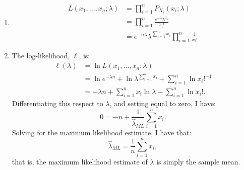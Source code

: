 \begin{problem}{8}  $ $

\begin{enumerate}
\item

\begin{align*}
L(x_1, \ldots, x_n; \lambda) &= \prod_{i=1}^n P_{X_i}(x_i; \lambda)\\
& = \prod_{i=1}^n \frac{e^{-\lambda} \lambda^{x_i}}{x_i!} \\
&= e^{-n \lambda} \lambda ^{\sum_{i=1}^n x_i}\prod_{i=1}^n \frac{1}{x_i!}
\end{align*}

\item The log-likelihood, $\ell$, is:
\begin{align*}
\ell(\lambda) &= \ln L(x_1, \ldots, x_n; \lambda) \\
& = \ln e^{-\lambda n} +\ln \lambda ^{\sum_{i=1}^n {x_i}} +\sum_{i=1}^n \ln x_i!^{-1} \\
& = -\lambda n +\sum_{i=1}^n x_i \ln \lambda -\sum_{i=1}^n \ln x_i!.
\end{align*}
Differentiating this respect to $\lambda$, and setting equal to zero, I have:
\begin{equation*}
0 = -n + \frac{1}{\hat \lambda_{ML}}\sum_{i=1}^n x_i.
\end{equation*}
Solving for the maximum likelihood estimate, I have that:
\begin{equation*}
\hat \lambda_{ML} = \frac{1}{n}\sum_{i=1}^n x_i,
\end{equation*}
that is, the maximum likelihood estimate of $\lambda$ is simply the sample mean.

\end{enumerate}
\end{problem}



